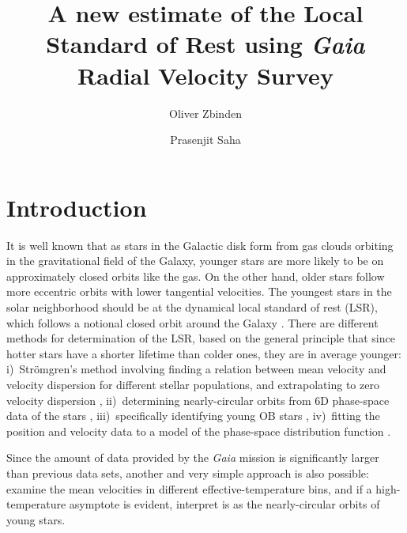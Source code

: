 \documentclass{aastex62}
\begin{document}
	
\title{A new estimate of the Local Standard of Rest using \textit{Gaia} Radial Velocity Survey}
	
	
	\author{Oliver Zbinden}
	
	
	\author{Prasenjit Saha}

	
\section{Introduction}\label{intro}
	
It is well known that as stars in the Galactic disk form from gas clouds orbiting in the gravitational field of the Galaxy, younger stars are more likely to be on approximately closed orbits like the gas. On the other hand, older stars follow more eccentric orbits with lower tangential velocities.  The youngest stars in the solar neighborhood should be at the dynamical local standard of rest (LSR), which follows a notional closed orbit around the Galaxy \citep[see e.g.,][]{shu}.  There are different methods for determination of the LSR, based on the general principle that since hotter stars have a shorter lifetime than colder ones, they are in average younger:  i)~Str\"omgren's method involving finding a relation between mean velocity and velocity dispersion for different stellar populations, and extrapolating to zero velocity dispersion \citep[e.g.,][]{ding}, ii)~determining nearly-circular orbits from 6D phase-space data of the stars \citep{francis}, iii)~specifically identifying young OB stars \citep{boby}, iv)~fitting the position and velocity data to a model of the phase-space distribution function \citep{schoenrich}.

Since the amount of data provided by the \textit{Gaia} mission \citep{gaiamission} is significantly larger than previous data sets, another and very simple approach is also possible: examine the mean velocities in different effective-temperature bins, and if a high-temperature asymptote is evident, interpret is as the nearly-circular orbits of young stars.
	
\end{document}
